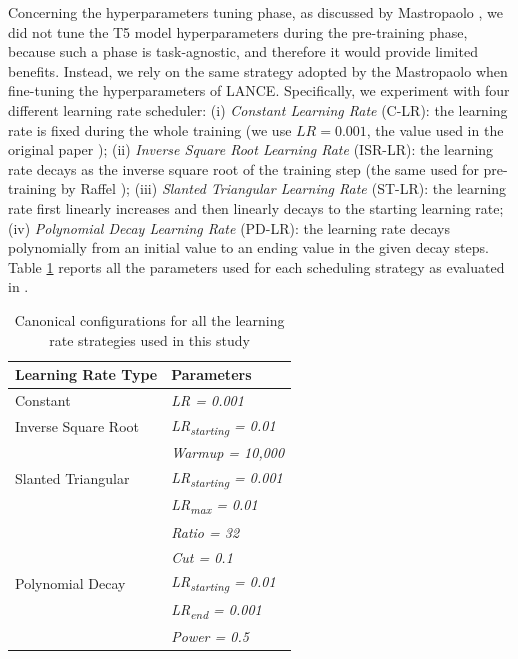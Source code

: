 Concerning the hyperparameters tuning phase, as discussed by Mastropaolo \etal \cite{mastropaolo2021studying}, we did not tune the T5 model hyperparameters during the pre-training phase, because such a phase is task-agnostic, and therefore it would provide limited benefits. Instead, we rely on the same strategy adopted by the Mastropaolo \etal \cite{mastropaolo2022using} when fine-tuning the hyperparameters of LANCE. Specifically, we experiment with four different learning rate scheduler: (i) \textit{Constant Learning Rate} (C-LR): the learning rate is fixed during the whole training (we use $LR = 0.001$, \ie the value used in the original paper \cite{raffel2019exploring}); (ii) \textit{Inverse Square Root Learning Rate} (ISR-LR): the learning rate decays as the inverse square root of the training step (the same used for pre-training by Raffel \etal); (iii) \textit{Slanted Triangular Learning Rate \cite{howard2018universal}} (ST-LR): the learning rate first linearly increases and then linearly decays to the starting learning rate;  (iv) \textit{Polynomial Decay Learning Rate} (PD-LR): the learning rate decays polynomially from an initial value to an ending value in the given decay steps.
Table \ref{tab:learning-rates} reports all the parameters used for each scheduling strategy as evaluated in \cite{mastropaolo2022using}.

\begin{table}[h]
	\centering
	\begin{tabular}{ll}
		\hline
		\textbf{Learning Rate Type} & \textbf{Parameters}               \\ \hline
		Constant                     & \textit{LR = 0.001}               \\
		Inverse Square Root         & \textit{LR\textsubscript{starting} = 0.01}  \\
		& \textit{Warmup = 10,000}          \\
		Slanted Triangular          & \textit{LR\textsubscript{starting} = 0.001} \\
		& \textit{LR\textsubscript{max} = 0.01}       \\
		& \textit{Ratio = 32}               \\
		& \textit{Cut = 0.1}                \\
		Polynomial Decay            & \textit{LR\textsubscript{starting} = 0.01}  \\
		& \textit{LR\textsubscript{end} = 0.001}      \\
		& \textit{Power = 0.5}              \\ \hline
	\end{tabular}
	\vspace{0.2cm}
	\caption{Canonical configurations for all the learning rate strategies used in this study}
	\label{tab:learning-rates}
\end{table}

